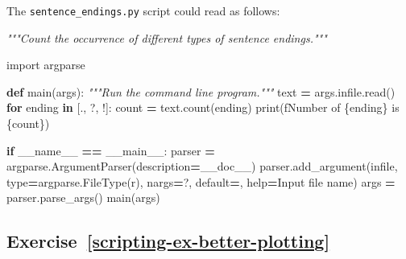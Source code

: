\documentclass[
]{krantz}
\makeatletter
\newenvironment{Shaded}{\begin{snugshade}}{\end{snugshade}}
\newcommand{\BuiltInTok}[1]{#1}
\newcommand{\CommentTok}[1]{\textcolor[rgb]{0.56,0.35,0.01}{\textit{#1}}}
\newcommand{\ControlFlowTok}[1]{\textcolor[rgb]{0.13,0.29,0.53}{\textbf{#1}}}
\newcommand{\ImportTok}[1]{#1}
\newcommand{\KeywordTok}[1]{\textcolor[rgb]{0.13,0.29,0.53}{\textbf{#1}}}
\newcommand{\NormalTok}[1]{#1}
\newcommand{\OperatorTok}[1]{\textcolor[rgb]{0.81,0.36,0.00}{\textbf{#1}}}
\newcommand{\SpecialCharTok}[1]{\textcolor[rgb]{0.00,0.00,0.00}{#1}}
\newcommand{\SpecialStringTok}[1]{\textcolor[rgb]{0.31,0.60,0.02}{#1}}
\newcommand{\StringTok}[1]{\textcolor[rgb]{0.31,0.60,0.02}{#1}}
\newcommand{\VariableTok}[1]{\textcolor[rgb]{0.00,0.00,0.00}{#1}}
\newenvironment{kframe}{%
\medskip{}
\setlength{\fboxsep}{.8em}
 \def\at@end@of@kframe{}%
 \ifinner\ifhmode%
  \def\at@end@of@kframe{\end{minipage}}%
  \begin{minipage}{\columnwidth}%
 \fi\fi%
 \def\FrameCommand##1{\hskip\@totalleftmargin \hskip-\fboxsep
 \colorbox{shadecolor}{##1}\hskip-\fboxsep
     \hskip-\linewidth \hskip-\@totalleftmargin \hskip\columnwidth}%
 \MakeFramed {\advance\hsize-\width
   \@totalleftmargin\z@ \linewidth\hsize
   \@setminipage}}%
 {\par\unskip\endMakeFramed%
 \at@end@of@kframe}
\renewenvironment{Shaded}{\begin{kframe}}{\end{kframe}}
\makeatother
\begin{document}
The \texttt{sentence\_endings.py} script could read as follows:

\begin{Shaded}
\begin{Highlighting}[]
\CommentTok{"""Count the occurrence of different types of sentence endings."""}

\ImportTok{import}\NormalTok{ argparse}


\KeywordTok{def}\NormalTok{ main(args):}
    \CommentTok{"""Run the command line program."""}
\NormalTok{    text }\OperatorTok{=}\NormalTok{ args.infile.read()}
    \ControlFlowTok{for}\NormalTok{ ending }\KeywordTok{in}\NormalTok{ [}\StringTok{\textquotesingle{}.\textquotesingle{}}\NormalTok{, }\StringTok{\textquotesingle{}?\textquotesingle{}}\NormalTok{, }\StringTok{\textquotesingle{}!\textquotesingle{}}\NormalTok{]:}
\NormalTok{        count }\OperatorTok{=}\NormalTok{ text.count(ending)}
        \BuiltInTok{print}\NormalTok{(}\SpecialStringTok{f\textquotesingle{}Number of }\SpecialCharTok{\{}\NormalTok{ending}\SpecialCharTok{\}}\SpecialStringTok{ is }\SpecialCharTok{\{}\NormalTok{count}\SpecialCharTok{\}}\SpecialStringTok{\textquotesingle{}}\NormalTok{)}

 
\ControlFlowTok{if} \VariableTok{\_\_name\_\_} \OperatorTok{==} \StringTok{\textquotesingle{}\_\_main\_\_\textquotesingle{}}\NormalTok{:}
\NormalTok{    parser }\OperatorTok{=}\NormalTok{ argparse.ArgumentParser(description}\OperatorTok{=}\NormalTok{\_\_doc\_\_)}
\NormalTok{    parser.add\_argument(}\StringTok{\textquotesingle{}infile\textquotesingle{}}\NormalTok{, }\BuiltInTok{type}\OperatorTok{=}\NormalTok{argparse.FileType(}\StringTok{\textquotesingle{}r\textquotesingle{}}\NormalTok{), nargs}\OperatorTok{=}\StringTok{\textquotesingle{}?\textquotesingle{}}\NormalTok{,}
\NormalTok{                        default}\OperatorTok{=}\StringTok{\textquotesingle{}{-}\textquotesingle{}}\NormalTok{, }\BuiltInTok{help}\OperatorTok{=}\StringTok{\textquotesingle{}Input file name\textquotesingle{}}\NormalTok{)}
\NormalTok{    args }\OperatorTok{=}\NormalTok{ parser.parse\_args()}
\NormalTok{    main(args)}
\end{Highlighting}
\end{Shaded}

\hypertarget{exercise-refscripting-ex-better-plotting}{%
\subsection*{Exercise~\ref{scripting-ex-better-plotting}}\label{exercise-refscripting-ex-better-plotting}}
\end{document}
